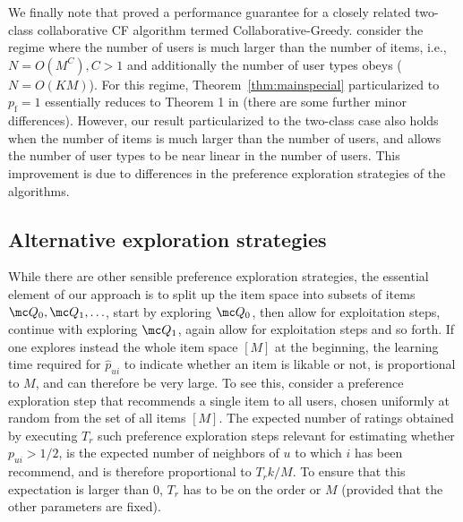 \documentclass{article}
\newcommand\pf{p_{\mathrm{f}}}
\newcommand\nuser{N} %
\newcommand\nitem{M}
\newcommand\ngroups{K}
\newcommand{\setQ}{\mc Q}
\begin{document}
We finally note that \citet{bresler_latent_2014} proved a performance guarantee for a closely related two-class collaborative CF algorithm termed Collaborative-Greedy. \citet{bresler_latent_2014} consider the regime where the number of users is much larger than the number of items, i.e., $\nuser = O(\nitem^C), C > 1$ and additionally the number of user types obeys ($\nuser = O(\ngroups \nitem)$). 
For this regime, Theorem~\ref{thm:mainspecial} particularized to $\pf=1$ essentially  reduces to Theorem 1 in \cite{bresler_latent_2014} (there are some further minor differences). 
However, our result particularized to the two-class case also holds when the number of items is much larger than the number of users, and allows the number of user types to be near linear in the number of users. 
This improvement is due to differences in the preference exploration strategies of the algorithms.

\vspace{-0.2cm}
\subsection{Alternative exploration strategies}
\vspace{-0.2cm}

While there are other sensible preference exploration strategies, the essential element of our approach is to split up the item space into subsets of items $\setQ_0,\setQ_1,\ldots$, start by exploring $\setQ_0$, then allow for exploitation steps, continue with exploring $\setQ_1$, again allow for exploitation steps and so forth. 
If one explores instead the whole item space $[M]$ at the beginning, the learning time required for $\hat p_{ui}$ to indicate whether an item is likable or not, is proportional to $\nitem$, and can therefore be very large. 
To see this, consider a preference exploration step that recommends a single item to all users, chosen uniformly at random from the set of all items $[M]$. 
The expected number of  ratings obtained by executing $T_r$ such preference exploration steps  
relevant for estimating whether $p_{ui}>1/2$, is the expected number of neighbors of $u$ to which $i$ has been recommend, and is therefore proportional to $T_r k / M$. To ensure that this expectation is larger than $0$, $T_r$ has to be on the order or $\nitem$ (provided that the other parameters are fixed). 
\end{document}
